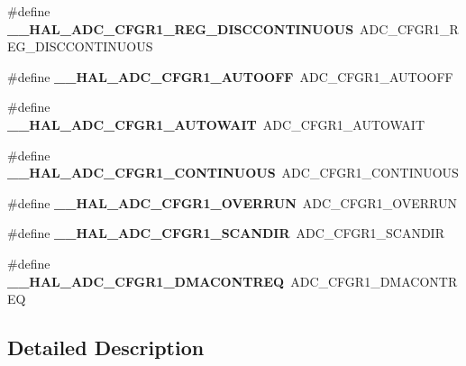 \begin{DoxyCompactItemize}
\item 
\hypertarget{group___h_a_l___a_d_c___aliased___macros_ga3703e313dbcb2af3dea5a07d622e67c6}{\#define {\bfseries \-\_\-\-\_\-\-H\-A\-L\-\_\-\-A\-D\-C\-\_\-\-C\-F\-G\-R1\-\_\-\-R\-E\-G\-\_\-\-D\-I\-S\-C\-C\-O\-N\-T\-I\-N\-U\-O\-U\-S}~A\-D\-C\-\_\-\-C\-F\-G\-R1\-\_\-\-R\-E\-G\-\_\-\-D\-I\-S\-C\-C\-O\-N\-T\-I\-N\-U\-O\-U\-S}\label{group___h_a_l___a_d_c___aliased___macros_ga3703e313dbcb2af3dea5a07d622e67c6}

\item 
\hypertarget{group___h_a_l___a_d_c___aliased___macros_gab767937348c3e3b3c22e7316e42004c1}{\#define {\bfseries \-\_\-\-\_\-\-H\-A\-L\-\_\-\-A\-D\-C\-\_\-\-C\-F\-G\-R1\-\_\-\-A\-U\-T\-O\-O\-F\-F}~A\-D\-C\-\_\-\-C\-F\-G\-R1\-\_\-\-A\-U\-T\-O\-O\-F\-F}\label{group___h_a_l___a_d_c___aliased___macros_gab767937348c3e3b3c22e7316e42004c1}

\item 
\hypertarget{group___h_a_l___a_d_c___aliased___macros_ga400e3c69f55dad73669df7ce10297066}{\#define {\bfseries \-\_\-\-\_\-\-H\-A\-L\-\_\-\-A\-D\-C\-\_\-\-C\-F\-G\-R1\-\_\-\-A\-U\-T\-O\-W\-A\-I\-T}~A\-D\-C\-\_\-\-C\-F\-G\-R1\-\_\-\-A\-U\-T\-O\-W\-A\-I\-T}\label{group___h_a_l___a_d_c___aliased___macros_ga400e3c69f55dad73669df7ce10297066}

\item 
\hypertarget{group___h_a_l___a_d_c___aliased___macros_ga6e3bc5992840ed200085c9b3ba68d7d2}{\#define {\bfseries \-\_\-\-\_\-\-H\-A\-L\-\_\-\-A\-D\-C\-\_\-\-C\-F\-G\-R1\-\_\-\-C\-O\-N\-T\-I\-N\-U\-O\-U\-S}~A\-D\-C\-\_\-\-C\-F\-G\-R1\-\_\-\-C\-O\-N\-T\-I\-N\-U\-O\-U\-S}\label{group___h_a_l___a_d_c___aliased___macros_ga6e3bc5992840ed200085c9b3ba68d7d2}

\item 
\hypertarget{group___h_a_l___a_d_c___aliased___macros_ga60d5ad7e386833338f43e293120fd20a}{\#define {\bfseries \-\_\-\-\_\-\-H\-A\-L\-\_\-\-A\-D\-C\-\_\-\-C\-F\-G\-R1\-\_\-\-O\-V\-E\-R\-R\-U\-N}~A\-D\-C\-\_\-\-C\-F\-G\-R1\-\_\-\-O\-V\-E\-R\-R\-U\-N}\label{group___h_a_l___a_d_c___aliased___macros_ga60d5ad7e386833338f43e293120fd20a}

\item 
\hypertarget{group___h_a_l___a_d_c___aliased___macros_gacadf737dca92c21560405c914f98ab06}{\#define {\bfseries \-\_\-\-\_\-\-H\-A\-L\-\_\-\-A\-D\-C\-\_\-\-C\-F\-G\-R1\-\_\-\-S\-C\-A\-N\-D\-I\-R}~A\-D\-C\-\_\-\-C\-F\-G\-R1\-\_\-\-S\-C\-A\-N\-D\-I\-R}\label{group___h_a_l___a_d_c___aliased___macros_gacadf737dca92c21560405c914f98ab06}

\item 
\hypertarget{group___h_a_l___a_d_c___aliased___macros_gad36423da25741a685c5aefd3cd0d08ee}{\#define {\bfseries \-\_\-\-\_\-\-H\-A\-L\-\_\-\-A\-D\-C\-\_\-\-C\-F\-G\-R1\-\_\-\-D\-M\-A\-C\-O\-N\-T\-R\-E\-Q}~A\-D\-C\-\_\-\-C\-F\-G\-R1\-\_\-\-D\-M\-A\-C\-O\-N\-T\-R\-E\-Q}\label{group___h_a_l___a_d_c___aliased___macros_gad36423da25741a685c5aefd3cd0d08ee}

\end{DoxyCompactItemize}


\subsection{Detailed Description}
